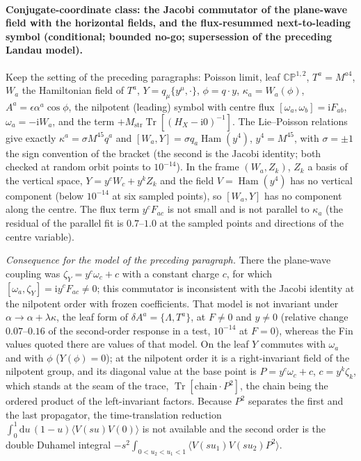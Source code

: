 \paragraph{Conjugate-coordinate class: the Jacobi commutator of the plane-wave field with the horizontal fields, and the flux-resummed next-to-leading symbol (conditional; bounded no-go; supersession of the preceding Landau model).}
Keep the setting of the preceding paragraphs: Poisson limit, leaf \(\mathbb{CP}^{1,2}\), \(T^a=M^{a4}\), \(W_a\) the Hamiltonian field of \(T^a\), \(Y=q_\mu\{y^\mu,\cdot\}\), \(\phi=q\cdot y\), \(\kappa_a=W_a(\phi)\), \(A^a=\epsilon\alpha^a\cos\phi\), the nilpotent (leading) symbol with centre flux \([\omega_a,\omega_b]=\mathrm iF_{ab}\), \(\omega_a=-\mathrm iW_a\), and the term \(+M_{\mathrm{str}}\operatorname{Tr}[(H_X-\mathrm i0)^{-1}]\). The Lie--Poisson relations give exactly \(\kappa^a=\sigma M^{45}q^a\) and \([W_a,Y]=\sigma q_a\operatorname{Ham}(y^4)\), \(y^4=M^{45}\), with \(\sigma=\pm1\) the sign convention of the bracket (the second is the Jacobi identity; both checked at random orbit points to \(10^{-14}\)). In the frame \((W_a,Z_k)\), \(Z_k\) a basis of the vertical space, \(Y=y^cW_c+y^kZ_k\) and the field \(V=\operatorname{Ham}(y^4)\) has no vertical component (below \(10^{-14}\) at six sampled points), so \([W_a,Y]\) has no component along the centre. The flux term \(y^cF_{ac}\) is not small and is not parallel to \(\kappa_a\) (the residual of the parallel fit is \(0.7\)--\(1.0\) at the sampled points and directions of the centre variable).

\emph{Consequence for the model of the preceding paragraph.} There the plane-wave coupling was \(\zeta_Y=y^c\omega_c+c\) with a constant charge \(c\), for which \([\omega_a,\zeta_Y]=\mathrm iy^cF_{ac}\ne0\); this commutator is inconsistent with the Jacobi identity at the nilpotent order with frozen coefficients. That model is not invariant under \(\alpha\to\alpha+\lambda\kappa\), the leaf form of \(\delta A^a=\{\Lambda,T^a\}\), at \(F\ne0\) and \(y\ne0\) (relative change \(0.07\)--\(0.16\) of the second-order response in a test, \(10^{-14}\) at \(F=0\)), whereas the Fin values quoted there are values of that model. On the leaf \(Y\) commutes with \(\omega_a\) and with \(\phi\) (\(Y(\phi)=0\)); at the nilpotent order it is a right-invariant field of the nilpotent group, and its diagonal value at the base point is \(P=y^c\omega_c+c\), \(c=y^k\zeta_k\), which stands at the seam of the trace, \(\operatorname{Tr}[\text{chain}\cdot P^2]\), the chain being the ordered product of the left-invariant factors. Because \(P^2\) separates the first and the last propagator, the time-translation reduction \(\int_0^1\mathrm du\,(1-u)\langle V(su)V(0)\rangle\) is not available and the second order is the double Duhamel integral \(-s^2\int_{0<u_2<u_1<1}\langle V(su_1)V(su_2)P^2\rangle\).

